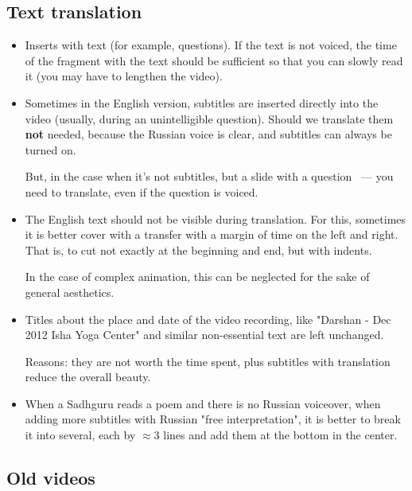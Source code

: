 \documentclass[
a4paper, %
12pt, %
article,
onecolumn, %
openany, %
]{memoir}
\begin{document}
\subsection{Text translation}

\begin{itemize}

\item Inserts with text (for example, questions). If the text is not voiced,
the time of the fragment with the text should be sufficient so that you can
slowly read it (you may have to lengthen the video).

\item Sometimes in the English version, subtitles are inserted directly into the video
{\color{gray}(usually, during an unintelligible question)}. Should we translate them
\textbf{not} needed, because the Russian voice is clear,
and subtitles can always be turned on.

But, in the case when it's not subtitles, but a slide with a question ~---
you need to translate, even if the question is voiced.
\item The English text should not be visible during translation. For this, sometimes it is better
cover with a transfer with a margin of time on the left and right. That is, to cut
not exactly at the beginning and end, but with indents.

In the case of complex animation, this can be neglected for the sake of general aesthetics.


\item Titles about the place and date of the video recording, like "Darshan - Dec 2012
Isha Yoga Center" and similar non-essential text are left unchanged.

{\color{gray} Reasons: they are not worth the time spent, plus
subtitles with translation reduce the overall beauty.}

\item When a Sadhguru reads a poem and there is no Russian voiceover, when adding
more subtitles with Russian "free interpretation", it is better to break it into
several, each
by $\approx 3$ lines and add them at the bottom in the center.

\end{itemize}


\subsection{Old videos}
\end{document}
